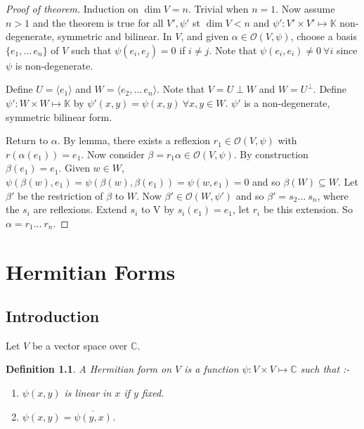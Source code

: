 \documentclass{notes}
\theoremstyle{plain}
\newtheorem{definition}[theorem]{Definition}
\begin{document}
\begin{proof}[Proof of theorem]
  Induction on $\dim V = n$.  Trivial when $n = 1$.  Now assume $n >
  1$ and the theorem is true for all $V', \psi'$ st $\dim V < n$ and
  $\psi' : V' \times V' \mapsto \mathbb{K}$ non-degenerate, symmetric
  and bilinear.  In $V$, and given $\alpha \in \mathcal{O}(V,\psi)$,
  choose a basis $\{ e_1, \dots\, e_n\}$ of $V$ such that
  $\psi(e_i,e_j) = 0$ if $i \ne j$.  Note that $\psi(e_i,e_i) \ne 0 \:
  \forall i$ since $\psi$ is non-degenerate.
  
  Define $U = \langle e_1 \rangle$ and $W = \langle e_2,\dots\,e_n
  \rangle$.  Note that $V = U \perp W$ and $W = U^{\perp}$.  Define
  $\psi' : W \times W \mapsto \mathbb{K}$ by $\psi'(x,y) = \psi(x,y)
  \: \forall x,y \in W$.  $\psi'$ is a non-degenerate, symmetric
  bilinear form.
  
  Return to $\alpha$.  By lemma, there exists a reflexion $r_1 \in
  \mathcal{O}(V,\psi)$ with $r(\alpha(e_1))=e_1$.  Now consider $\beta
  = r_1\alpha \in \mathcal{O}(V,\psi)$.  By construction $\beta(e_1) =
  e_1$.  Given $w \in W$, $\psi(\beta(w),e_1) =
  \psi(\beta(w),\beta(e_1))=\psi(w,e_1)=0$ and so $\beta(W) \subseteq
  W$.  Let $\beta'$ be the restriction of $\beta$ to $W$.  Now $\beta'
  \in \mathcal{O}(W,\psi')$ and so $\beta' = s_2\dots\ s_n$, where the
  $s_i$ are reflexions.  Extend $s_i$ to V by $s_i(e_1) = e_1$, let
  $r_i$ be this extension.  So $\alpha = r_1\dots\ r_n$.
\end{proof}

\chapter{Hermitian Forms}

\section{Introduction}

Let $V$ be a vector space over $\mathbb{C}$.

\begin{definition}
  A Hermitian form on $V$ is a function $\psi : V \times V \mapsto
  \mathbb{C}$ such that :-
\begin{enumerate}
\item $\psi(x,y)$ is linear in $x$ if $y$ fixed.
\item $\psi(x,y) = \overline{\psi(y,x)}$.
\end{enumerate}
\end{definition}
\end{document}
